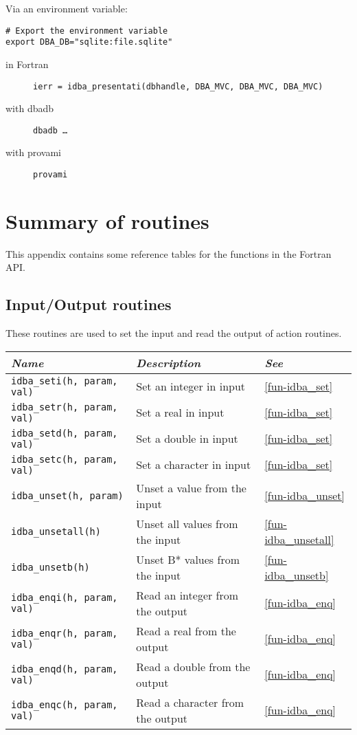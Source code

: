 \documentclass[final,12pt,a4paper,twoside]{book}
\begin{document}
Via an environment variable:

\begin{verbatim}
# Export the environment variable
export DBA_DB="sqlite:file.sqlite"
\end{verbatim}

\begin{description}
\item[in Fortran]
  {\tt ierr = idba\_presentati(dbhandle, DBA\_MVC, DBA\_MVC, DBA\_MVC)}
\item[with dbadb]
  {\tt dbadb \dots}
\item[with provami]
  {\tt provami}
\end{description}


\chapter{Summary of routines}

This appendix contains some reference tables for the functions in the Fortran
API.

\section{Input/Output routines}

These routines are used to set the input and read the output of action routines.

\begin{tabular}{|l|l|l|}
\hline
{\em Name}                      & {\em Description}                & {\em See} \\
\hline
{\tt \small idba\_seti(h, param, val)} & Set an integer in input          & \ref{fun-idba_set} \\
{\tt \small idba\_setr(h, param, val)} & Set a real in input              & \ref{fun-idba_set} \\
{\tt \small idba\_setd(h, param, val)} & Set a double in input            & \ref{fun-idba_set} \\
{\tt \small idba\_setc(h, param, val)} & Set a character in input         & \ref{fun-idba_set} \\
{\tt \small idba\_unset(h, param)}     & Unset a value from the input     & \ref{fun-idba_unset} \\
{\tt \small idba\_unsetall(h)}         & Unset all values from the input  & \ref{fun-idba_unsetall} \\
{\tt \small idba\_unsetb(h)}           & Unset B* values from the input   & \ref{fun-idba_unsetb} \\
{\tt \small idba\_enqi(h, param, val)} & Read an integer from the output  & \ref{fun-idba_enq} \\
{\tt \small idba\_enqr(h, param, val)} & Read a real from the output      & \ref{fun-idba_enq} \\
{\tt \small idba\_enqd(h, param, val)} & Read a double from the output    & \ref{fun-idba_enq} \\
{\tt \small idba\_enqc(h, param, val)} & Read a character from the output & \ref{fun-idba_enq} \\
\hline
\end{tabular}
\end{document}
